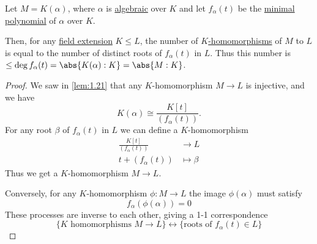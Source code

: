 \documentclass{article}
\begin{document}
\begin{nlemma}\label{lem:2.6}
    Let $M = K(\alpha)$, where $\alpha$ is \hyperlink{def:algebraic}{algebraic} over $K$ and let $f_\alpha(t)$ be the \hyperlink{def:minimalPoly}{minimal polynomial} of $\alpha$ over $K$.

    Then, for any \hyperlink{def:fieldExt}{field extension} $K \leq L$, the number of \hyperlink{def:homo}{$K$-homomorphisms} of $M$ to $L$ is equal to the number of distinct roots of $f_\alpha(t)$ in $L$.
    Thus this number is $\leq \deg f_\alpha(t) = \abs{K(\alpha):K} = \abs{M:K}$.

    \begin{center}
    \end{center}
\end{nlemma}

\begin{proof}
    We saw in \cref{lem:1.21} that any $K$-homomorphism $M \to L$ is injective, and we have
    \begin{equation*}
        K(\alpha) \cong \frac{K[t]}{(f_\alpha(t))}.
    \end{equation*}
    For any root $\beta$ of $f_\alpha(t)$ in $L$ we can define a $K$-homomorphism
    \begin{align*}
        \frac{K[t]}{(f_\alpha(t))} &\to L \\
        t + (f_\alpha(t)) &\mapsto \beta
    \end{align*}
    Thus we get a $K$-homomorphism $M \to L$.

    Conversely, for any $K$-homomorphism $\phi:M \to L$ the image $\phi(\alpha)$ must satisfy
    \begin{equation*}f_\alpha(\phi(\alpha)) = 0\end{equation*}
    These processes are inverse to each other, giving a 1-1 correspondence
    \begin{equation*}
        \{K \text{ homomorphisms } M \to L\} \longleftrightarrow \{\text{roots of } f_\alpha(t) \in L\}
    \end{equation*}
\end{proof}

\end{document}
